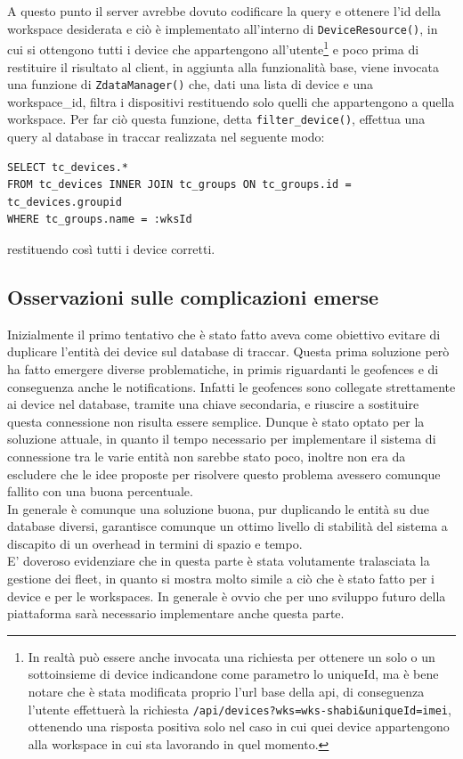 \documentclass[a4paper,titlepage,12pt]{book}
\begin{document}
A questo punto il server avrebbe dovuto codificare la query e ottenere l'id della workspace desiderata e ciò è implementato all'interno di \texttt{DeviceResource()}, in cui si ottengono tutti i device che appartengono all'utente\footnote{\sffamily In realtà può essere anche invocata una richiesta per ottenere un solo o un sottoinsieme di device indicandone come parametro lo uniqueId, ma è bene notare che è stata modificata proprio l'url base della api, di conseguenza l'utente effettuerà la richiesta \texttt{/api/devices?wks=wks-shabi\&uniqueId=imei}, ottenendo una risposta positiva solo nel caso in cui quei device appartengono alla workspace in cui sta lavorando in quel momento.} e poco prima di restituire il risultato al client, in aggiunta alla funzionalità base, viene invocata una funzione di \texttt{ZdataManager()} che, dati una lista di device e una workspace\_id, filtra i dispositivi restituendo solo quelli che appartengono a quella workspace. Per far ciò questa funzione, detta \texttt{filter\_device()}, effettua una query al database in traccar realizzata nel seguente modo:

\begin{verbatim}
SELECT tc_devices.* 
FROM tc_devices INNER JOIN tc_groups ON tc_groups.id = tc_devices.groupid 
WHERE tc_groups.name = :wksId
\end{verbatim}

\noindent restituendo così tutti i device corretti.
\subsection{\sffamily
Osservazioni sulle complicazioni emerse}
Inizialmente il primo tentativo che è stato fatto aveva come obiettivo evitare di duplicare l'entità dei device sul database di traccar. Questa prima soluzione però ha fatto emergere diverse problematiche, in primis riguardanti le geofences e di conseguenza anche le notifications. Infatti le geofences sono collegate strettamente ai device nel database, tramite una chiave secondaria, e riuscire a sostituire questa connessione non risulta essere semplice. Dunque è stato optato per la soluzione attuale, in quanto il tempo necessario per implementare il sistema di connessione tra le varie entità non sarebbe stato poco, inoltre non era da escludere che le idee proposte per risolvere questo problema avessero comunque fallito con una buona percentuale.\\ In generale è comunque una soluzione buona, pur duplicando le entità su due database diversi, garantisce comunque un ottimo livello di stabilità del sistema a discapito di un overhead in termini di spazio e tempo.\\
E' doveroso evidenziare che in questa parte è stata volutamente tralasciata la gestione dei fleet, in quanto si mostra molto simile a ciò che è stato fatto per i device e per le workspaces. In generale è ovvio che per uno sviluppo futuro della piattaforma sarà necessario implementare anche questa parte.
\end{document}
